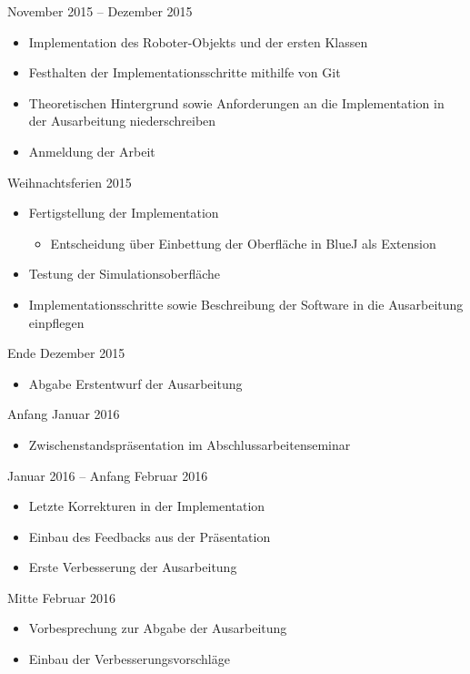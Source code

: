 \documentclass[paper=a4, pagesize, DIV=calc, BCOR=12.5mm, twoside=on, onecolumn=on, open = any, titlepage =on, parskip =half-, headsepline = on, footsepline = on, chapterprefix = on, appendixprefix = off, fontsize = 12pt, numbers = noenddot, abstract = on]{scrbook}
\numberwithin{equation}{chapter}
\begin{document}
November 2015 – Dezember 2015
\begin{itemize}
\item	Implementation des Roboter-Objekts und der ersten Klassen
\item	Festhalten der Implementationsschritte mithilfe von Git
\item	Theoretischen Hintergrund sowie Anforderungen an die Implementation in der Ausarbeitung niederschreiben
\item	Anmeldung der Arbeit
\end{itemize}

Weihnachtsferien 2015 
\begin{itemize}
\item	Fertigstellung der Implementation
\begin{itemize}
\item Entscheidung über Einbettung der Oberfläche in BlueJ als Extension
\end{itemize}
\item	Testung der Simulationsoberfläche
\item	Implementationsschritte sowie Beschreibung der Software in die Ausarbeitung einpflegen
\end{itemize}

Ende Dezember 2015
\begin{itemize}
\item 	Abgabe Erstentwurf der Ausarbeitung
\end{itemize}

Anfang Januar 2016
\begin{itemize}
\item Zwischenstandspräsentation im Abschlussarbeitenseminar
\end{itemize}

Januar 2016 – Anfang Februar 2016
\begin{itemize}
\item Letzte Korrekturen in der Implementation
\item	Einbau des Feedbacks aus der Präsentation
\item	Erste Verbesserung der Ausarbeitung
\end{itemize}

Mitte Februar 2016
\begin{itemize}
\item Vorbesprechung zur Abgabe der Ausarbeitung
\item Einbau der Verbesserungsvorschläge
\end{itemize}
\end{document}
